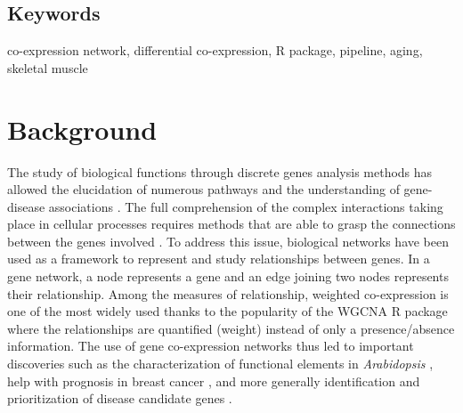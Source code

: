 \subsection{Keywords}
co-expression network, differential co-expression, R package, pipeline, aging, skeletal muscle





\section{Background}


The study of biological functions through discrete genes analysis methods has allowed the elucidation of numerous pathways and the understanding of gene-disease associations . The full comprehension of the complex interactions taking place in cellular processes requires methods that are able to grasp the connections between the genes involved . To address this issue, biological networks have been used as a framework to represent and study relationships between genes. In a gene network, a node represents a gene and an edge joining two nodes represents their relationship. Among the measures of relationship, weighted co-expression is one of the most widely used thanks to the popularity of the WGCNA R package  where the relationships are quantified (weight) instead of only a presence/absence information. The use of gene co-expression networks thus led to important discoveries such as the characterization of functional elements in \textit{Arabidopsis} , help with prognosis in breast cancer , and more generally identification and prioritization of disease candidate genes . 

